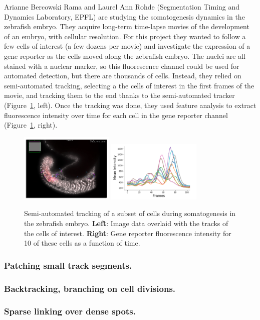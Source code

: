 Arianne Bercowski Rama and Laurel Ann Rohde (Segmentation Timing and Dynamics Laboratory, EPFL) are studying the somatogenesis dynamics in the zebrafish embryo.
They acquire long-term time-lapse movies of the development of an embryo, with cellular resolution.
For this project they wanted to follow a few cells of interest (a few dozens per movie) and investigate the expression of a gene reporter as the cells moved along the zebrafish embryo.
The nuclei are all stained with a nuclear marker, so this fluorescence channel could be used for automated detection, but there are thousands of cells.
Instead, they relied on semi-automated tracking, selecting a the cells of interest in the first frames of the movie, and tracking them to the end thanks to the semi-automated tracker (Figure~\ref{fig:ArianneUseCase}, left). 
Once the tracking was done, they used feature analysis to extract fluorescence intensity over time for each cell in the gene reporter channel (Figure~\ref{fig:ArianneUseCase}, right).


\begin{figure}
    \centering
    \null\hfill
    \includegraphics[width=0.4\textwidth]{figures/Mastodon_ArianneUseCase_01.png}
    \hfill
    \includegraphics[width=0.4\textwidth]{figures/Mastodon_ArianneUseCase_02.png}
    \hfill\null
    \caption{Semi-automated tracking of a subset of cells during somatogenesis in the zebrafish embryo. \textbf{Left}: Image data overlaid with the tracks of the cells of interest. \textbf{Right}: Gene reporter fluorescence intensity for 10 of these cells as a function of time.}
    \label{fig:ArianneUseCase}
\end{figure}




\subsubsection{Patching small track segments.}

\subsubsection{Backtracking, branching on cell divisions. }

\subsubsection{Sparse linking over dense spots.}
